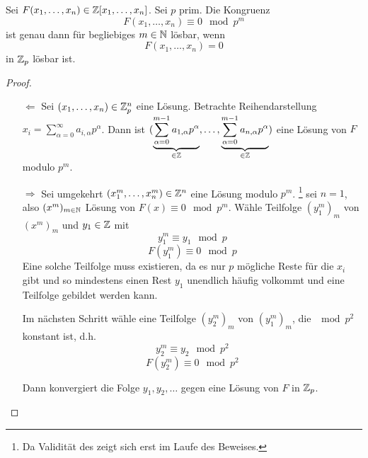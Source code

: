 \documentclass[../main.tex]{subfiles}
\begin{document}
\begin{theorem} %
    Sei $F(x_1,\dots, x_n)\in \mathbb{Z}[x_1,\dots,x_n]$.
    Sei $p$ prim. Die Kongruenz $$F(x_1,\dots,x_n) \equiv 0\mod p^m$$
    ist genau dann für begliebiges $m \in \mathbb{N}$ lösbar, wenn $$F(x_1,\dots,x_n)=0$$ in $\mathbb{Z}_p$ lösbar ist.
\end{theorem}
\begin{proof}$ $
    \begin{itemize}
        \item[$\Leftarrow$]
        Sei $(x_1,\dots,x_n)\in \mathbb{Z}_p^n$ eine Lösung. 
        Betrachte Reihendarstellung $x_i=\sum_{\alpha=0}^\infty a_{i,\alpha} p^\alpha$.
        Dann ist $(\underbrace{\sum_{\alpha =0}^{m-1} a_{1,\alpha} p^\alpha}_{\in\mathbb{Z}}, \dots,\underbrace{\sum_{\alpha = 0}^{m-1} a_{n,\alpha}p^\alpha}_{\in\mathbb{Z}})$
        eine Lösung von $F$ modulo $p^m$.
        \item[$\Rightarrow$]
        Sei umgekehrt $(x_1^m, \dots, x_n^m) \in \mathbb{Z}^n$ eine Lösung modulo $p^m$.
        \obda\footnote{Da Validität des \obda zeigt sich erst im Laufe des Beweises.} sei $n=1$, also $(x^m)_{m\in\mathbb{N}}$ Lösung von $F(x) \equiv 0\mod p^m$.
        Wähle Teilfolge $(y_1^m)_m$ von $(x^m)_m$ und $y_1\in \mathbb{Z}$ mit $$y_1^m \equiv y_1\mod p$$
        $$F(y_1^m)\equiv 0 \mod p$$
        Eine solche Teilfolge muss existieren, da es nur $p$ mögliche Reste für die $x_i$ gibt und so mindestens einen Rest $y_1$ unendlich häufig volkommt und eine Teilfolge gebildet werden kann.
        
        Im nächsten Schritt wähle eine Teilfolge $(y_2^m)_m$ von $(y_1^m)_m$, die $\mod p^2$ konstant ist, d.h. $$y_2^m\equiv y_2\mod p^2$$
        $$F(y_2^m) \equiv 0\mod p^2$$
    
        Dann konvergiert die Folge $y_1,y_2,\dots$ gegen eine Lösung von $F$ in $\mathbb{Z}_p$.
    \end{itemize}
\end{proof}
\end{document}
